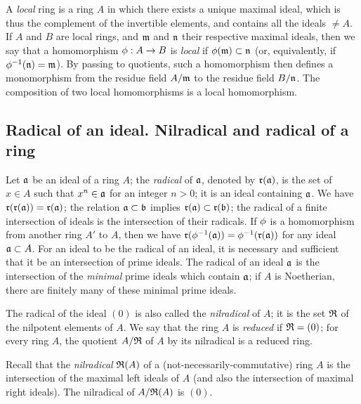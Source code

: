 \begin{env}[1.0.7]
\label{0.1.0.7}
A {\em local} ring is a ring $A$ in which there exists a unique maximal ideal, which is thus the complement of the invertible elements, and contains all the ideals $\neq A$.
If $A$ and $B$ are local rings, and $\mathfrak{m}$ and $\mathfrak{n}$ their respective maximal ideals, then we say that a homomorphism $\phi:A\to B$ is {\em local} if $\phi(\mathfrak{m})\subset\mathfrak{n}$ (or, equivalently, if $\phi^{-1}(\mathfrak{n})=\mathfrak{m}$).
By passing to quotients, such a homomorphism then defines a monomorphism from the residue field $A/\mathfrak{m}$ to the residue field $B/\mathfrak{n}$.
The composition of two local homomorphisms is a local homomorphism.
\end{env}

\subsection{Radical of an ideal. Nilradical and radical of a ring}
\label{subsection-radical-and-nilradical}

\begin{env}[1.1.1]
\label{0.1.1.1}
Let $\mathfrak{a}$ be an ideal of a ring $A$;
the {\em radical} of $\mathfrak{a}$, denoted by $\mathfrak{r}(\mathfrak{a})$, is the set of $x\in A$ such that $x^n\in\mathfrak{a}$ for an integer $n>0$;
it is an ideal containing $\mathfrak{a}$.
We have $\mathfrak{r}(\mathfrak{r}(\mathfrak{a}))=\mathfrak{r}(\mathfrak{a})$;
the relation $\mathfrak{a}\subset\mathfrak{b}$ implies $\mathfrak{r}(\mathfrak{a})\subset\mathfrak{r}(\mathfrak{b})$;
the radical of a finite intersection of ideals is the intersection of their radicals.
If $\phi$ is a homomorphism from another ring $A'$ to $A$, then we have $\mathfrak{r}(\phi^{-1}(\mathfrak{a}))=\phi^{-1}(\mathfrak{r}(\mathfrak{a}))$ for any ideal $\mathfrak{a}\subset A$.
For an ideal to be the radical of an ideal, it is necessary and sufficient that it be an intersection of prime ideals.
The radical of an ideal $\mathfrak{a}$ is the intersection of the {\em minimal} prime ideals which contain $\mathfrak{a}$;
if $A$ is Noetherian, there are finitely many of these minimal prime ideals.

The radical of the ideal $(0)$ is also called the {\em nilradical} of $A$;
it is the set $\mathfrak{R}$ of the nilpotent elements of $A$.
We say that the ring $A$ is {\em reduced} if $\mathfrak{R}=(0)$;
for every ring $A$, the quotient $A/\mathfrak{R}$ of $A$ by its nilradical is a reduced ring.
\end{env}

\begin{env}[1.1.2]
\label{0.1.1.2}
Recall that the {\em nilradical} $\mathfrak{R}(A)$ of a (not-necessarily-commutative) ring $A$ is the intersection of the maximal left ideals of $A$ (and also the intersection of maximal right ideals).
The nilradical of $A/\mathfrak{R}(A)$ is $(0)$.
\end{env}


